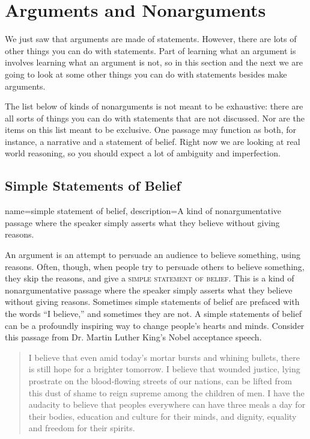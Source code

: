 
\section{Arguments and Nonarguments}
\label{sec:arguments_and_nonarguments}

We just saw that arguments are made of statements. However, there are lots of other things you can do with statements. Part of learning what an argument is involves learning what an argument is not, so in this section and the next we are going to look at some other things you can do with statements besides make arguments.

The list below of kinds of nonarguments is not meant to be exhaustive: there are all sorts of things you can do with statements that are not discussed. Nor are the items on this list meant to be exclusive. One passage may function as both, for instance, a narrative and a statement of belief. Right now we are looking at real world reasoning, so you should expect a lot of ambiguity and imperfection.

\subsection{Simple Statements of Belief}

{
name=simple statement of belief,
description={A kind of nonargumentative passage where the speaker simply asserts what they believe without giving reasons. }
}

An argument is an attempt to persuade an audience to believe something, using reasons. Often, though, when people try to persuade others to believe something, they skip the reasons, and give a \textsc{\gls{simple statement of belief}}. \label{def:simple_statement_of_belief} This is a kind of nonargumentative passage where the speaker simply asserts what they believe without giving reasons. Sometimes simple statements of belief are prefaced with the words ``I believe,'' and sometimes they are not. A simple statements of belief can be a profoundly inspiring way to change people's hearts and minds. Consider this passage from Dr. Martin Luther King's Nobel acceptance speech.

\begin{quotation} \noindent I believe that even amid today's mortar bursts and whining bullets, there is still hope for a brighter tomorrow. I believe that wounded justice, lying prostrate on the blood-flowing streets of our nations, can be lifted from this dust of shame to reign supreme among the children of men. I have the audacity to believe that peoples everywhere can have three meals a day for their bodies, education and culture for their minds, and dignity, equality and freedom for their spirits. \citep{King2001} \end{quotation}


